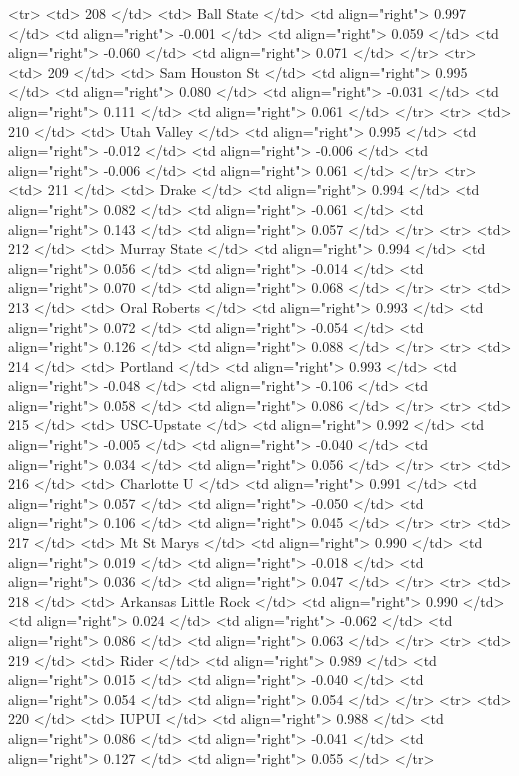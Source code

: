   <tr> <td> 208 </td> <td> Ball State </td> <td align="right"> 0.997 </td> <td align="right"> -0.001 </td> <td align="right"> 0.059 </td> <td align="right"> -0.060 </td> <td align="right"> 0.071 </td> </tr>
  <tr> <td> 209 </td> <td> Sam Houston St </td> <td align="right"> 0.995 </td> <td align="right"> 0.080 </td> <td align="right"> -0.031 </td> <td align="right"> 0.111 </td> <td align="right"> 0.061 </td> </tr>
  <tr> <td> 210 </td> <td> Utah Valley </td> <td align="right"> 0.995 </td> <td align="right"> -0.012 </td> <td align="right"> -0.006 </td> <td align="right"> -0.006 </td> <td align="right"> 0.061 </td> </tr>
  <tr> <td> 211 </td> <td> Drake </td> <td align="right"> 0.994 </td> <td align="right"> 0.082 </td> <td align="right"> -0.061 </td> <td align="right"> 0.143 </td> <td align="right"> 0.057 </td> </tr>
  <tr> <td> 212 </td> <td> Murray State </td> <td align="right"> 0.994 </td> <td align="right"> 0.056 </td> <td align="right"> -0.014 </td> <td align="right"> 0.070 </td> <td align="right"> 0.068 </td> </tr>
  <tr> <td> 213 </td> <td> Oral Roberts </td> <td align="right"> 0.993 </td> <td align="right"> 0.072 </td> <td align="right"> -0.054 </td> <td align="right"> 0.126 </td> <td align="right"> 0.088 </td> </tr>
  <tr> <td> 214 </td> <td> Portland </td> <td align="right"> 0.993 </td> <td align="right"> -0.048 </td> <td align="right"> -0.106 </td> <td align="right"> 0.058 </td> <td align="right"> 0.086 </td> </tr>
  <tr> <td> 215 </td> <td> USC-Upstate </td> <td align="right"> 0.992 </td> <td align="right"> -0.005 </td> <td align="right"> -0.040 </td> <td align="right"> 0.034 </td> <td align="right"> 0.056 </td> </tr>
  <tr> <td> 216 </td> <td> Charlotte U </td> <td align="right"> 0.991 </td> <td align="right"> 0.057 </td> <td align="right"> -0.050 </td> <td align="right"> 0.106 </td> <td align="right"> 0.045 </td> </tr>
  <tr> <td> 217 </td> <td> Mt St Marys </td> <td align="right"> 0.990 </td> <td align="right"> 0.019 </td> <td align="right"> -0.018 </td> <td align="right"> 0.036 </td> <td align="right"> 0.047 </td> </tr>
  <tr> <td> 218 </td> <td> Arkansas Little Rock </td> <td align="right"> 0.990 </td> <td align="right"> 0.024 </td> <td align="right"> -0.062 </td> <td align="right"> 0.086 </td> <td align="right"> 0.063 </td> </tr>
  <tr> <td> 219 </td> <td> Rider </td> <td align="right"> 0.989 </td> <td align="right"> 0.015 </td> <td align="right"> -0.040 </td> <td align="right"> 0.054 </td> <td align="right"> 0.054 </td> </tr>
  <tr> <td> 220 </td> <td> IUPUI </td> <td align="right"> 0.988 </td> <td align="right"> 0.086 </td> <td align="right"> -0.041 </td> <td align="right"> 0.127 </td> <td align="right"> 0.055 </td> </tr>

